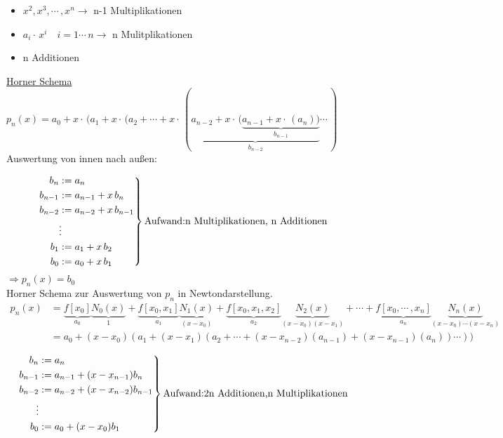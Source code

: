 \begin{itemize}
	\item $x^2, x^3,\cdots\,,x^n \rightarrow$ n-1 Multiplikationen
	\item $a_i\cdot\,x^i \quad i = 1\cdots\,n \rightarrow$ n Mulitplikationen
	\item n Additionen
\end{itemize}

\underline{Horner Schema}
$p_n(x) = a_0 + x\cdot\,(a_1 + x\cdot\,(a_2 + \cdots + x\cdot\,(\underbrace{a_{n-2} + x\cdot\,(\underbrace{a_{n-1} + x\cdot\,(a_n))}_{b_{n-1}}}_{b_{n-2}}\cdots\,)$
Auswertung von innen nach außen:

\begin{equation*}
\left.
\begin{aligned}
 b_n &:= a_n \\
 b_{n-1} &:= a_{n-1} + x\,b_n \\
 b_{n-2} &:= a_{n-2} + x\,b_{n-1} \\
 & \vdots \\
 b_{1} &:= a_{1} + x\,b_{2} \\
 b_{0} &:= a_{0} + x\,b_{1} 
\end{aligned}
\right\}
\text{Aufwand:} \\
\text{n Multiplikationen, n Additionen}
\end{equation*}
$\Rightarrow p_n(x) = b_0$\\

Horner Schema zur Auswertung von $p_n$ in Newtondarstellung.\\
\begin{align*}
 p_n(x) &= \underbrace{f[x_0]}_{a_0}\underbrace{N_0(x)}_{1} + \underbrace{f[x_0,x_1]}_{a_1}\underbrace{N_1(x)}_{(x-x_0)}
+ \underbrace{f[x_0,x_1,x_2]}_{a_2}\underbrace{N_2(x)}_{(x-x_0)(x-x_1)} + \cdots + \underbrace{f[x_0,\cdots\,,x_n]}_{a_n}\underbrace{N_n(x)}_{(x-x_0)\cdots(x-x_n)} \\
 &= a_0 + (x-x_0)(a_1 + (x-x_1)(a_2+ \cdots + (x-x_{n-2})(a_{n-1})+(x-x_{n-1})(a_n))\cdots)) \\
\end{align*}
\begin{equation*}
\left.
\begin{aligned}
 b_n &:= a_n \\
 b_{n-1} &:= a_{n-1} + (x-x_{n-1})b_n \\
 b_{n-2} &:= a_{n-2} + (x-x_{n-2})b_{n-1} \\
 \vdots \\
 b_0 &:= a_0 + (x-x_0)b_1
\end{aligned}
\right\}
\text{Aufwand: \\
2n Additionen, \\
n Multiplikationen}
\end{equation*}

